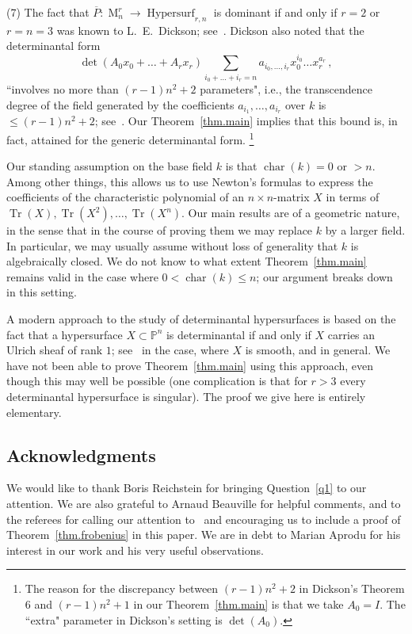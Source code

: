 \documentclass[12pt]{amsart}
\numberwithin{equation}{section}
\numberwithin{subsection}{section}
\theoremstyle{definition} \newtheorem{definition}[theorem]{Definition}
\newcommand\Char{\operatorname{char}}
\newcommand\Hypersurf{\operatorname{Hypersurf}}
\newcommand{\tr}{\operatorname{Tr}}
\newcommand{\Mat}{\operatorname{M}}
\newcommand{\bbP}{\mathbb{P}}
\begin{document}
\smallskip
(7) The fact that $\overline{P} \colon \Mat_n^r \to \Hypersurf_{r, n}$ 
is dominant if and only if $r = 2$ or $r = n = 3$ was known
to L.~E.~Dickson; see~\cite{dickson}. Dickson also noted that
the determinantal form 
\[ \det(A_0 x_0 + \dots + A_r x_r)
 \sum_{i_0 + \dots + i_r = n} a_{i_0, \dots, i_r} 
x_0^{i_0} \dots x_r^{a_r} \, , \]
``involves no more than $(r-1) n^2 + 2$ parameters", i.e.,
the transcendence degree of the field generated by the coefficients
$a_{i_1}, \dots, a_{i_r}$ over $k$ is $\leqslant (r-1)n^2 + 2$;
see~\cite[Theorem 6]{dickson}.  
Our Theorem~\ref{thm.main} implies that this bound is, in fact, 
attained for the generic determinantal form. \footnote{The reason
for the discrepancy between $(r-1)n^2 + 2$ in Dickson's Theorem 6 and
$(r-1)n^2 + 1$ in our Theorem~\ref{thm.main} is that we take
$A_0 = I$. The ``extra" parameter in Dickson's setting is $\det(A_0)$.}

\smallskip
Our standing assumption on the base field $k$ is that $\Char(k) = 0$ or 
$> n$. Among other things, this allows us to use Newton's 
formulas to express the coefficients of the characteristic polynomial 
of an $n \times n$-matrix $X$ in terms of $\tr(X), \tr(X^2), \ldots, \tr(X^n)$.
Our main results are of a geometric nature, in the sense that in 
the course of proving them we may replace $k$ by a larger field. 
In particular, we may usually assume without loss of generality 
that $k$ is algebraically closed.
We do not know to what extent Theorem~\ref{thm.main} remains valid in
the case where $0 < \Char(k) \leqslant n$; our argument breaks 
down in this setting.

A modern approach to the study of determinantal hypersurfaces 
is based on the fact that a hypersurface $X \subset \bbP^n$ 
is determinantal if and only if $X$ carries an Ulrich sheaf of rank $1$; 
see~\cite{beauville} in the case, where $X$ is smooth,
and \cite{es} in general. We have not been able to prove
Theorem~\ref{thm.main} using this approach, even though 
this may well be possible (one complication is that 
for $r > 3$ every determinantal hypersurface 
is singular). The proof we give here is entirely elementary.

\subsection*{Acknowledgments} We would like to thank Boris 
Reichstein for bringing Question~\ref{q1} to our attention. 
We are also grateful to 
Arnaud Beauville for helpful comments, and to the referees 
for calling our attention %
to~\cite{es} and encouraging us to include a proof
of Theorem~\ref{thm.frobenius} in this paper.
We are in debt to Marian Aprodu for his interest 
in our work and his very useful observations.
\end{document}
